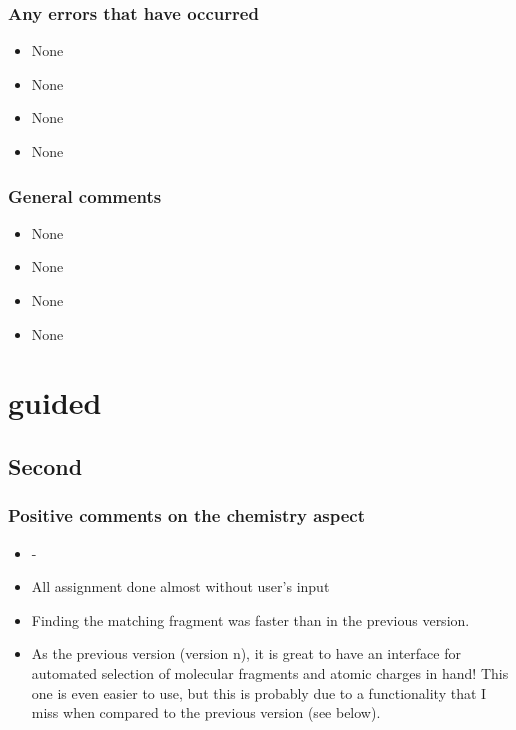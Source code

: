 \subsubsection{Any errors that have occurred}
\begin{itemize}
\item None

\item None

\item None

\item None

\end{itemize}


\subsubsection{General comments}
\begin{itemize}
\item None

\item None

\item None

\item None

\end{itemize}


\section{\oframp{} guided}
\subsection{Second}
\subsubsection{Positive comments on the chemistry aspect}
\begin{itemize}
\item -

\item All assignment done almost without user's input

\item Finding the matching fragment was faster than in the previous version.

\item As the previous version (version n), it is great to have an interface for automated selection of molecular fragments and atomic charges in hand! This one is even easier to use, but this is probably due to a functionality that I miss when compared to the previous version (see below).

\end{itemize}


